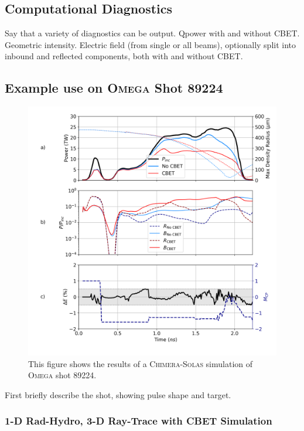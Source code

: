 \subsection{Computational Diagnostics}

Say that a variety of diagnostics can be output.
Qpower with and without CBET.
Geometric intensity.
Electric field (from single or all beams), optionally split into inbound and reflected components, both with and without CBET.

\subsection{Example use on \textsc{Omega} Shot 89224}

\begin{figure}[t!]
    \includegraphics[width=0.9\linewidth]{Numerics/Images/89224_absorption.png}
    \centering
    \caption{This figure shows the results of a \textsc{Chimera}-\textsc{Solas} simulation of \textsc{Omega} shot 89224.}%
    \label{fig:SOLAS_89224}
\end{figure}

First briefly describe the shot, showing pulse shape and target.

\subsubsection{1-D Rad-Hydro, 3-D Ray-Trace with CBET Simulation}

